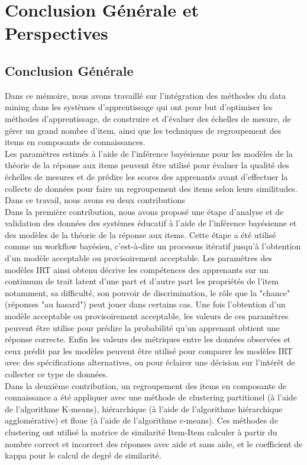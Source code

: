 \chapter*{Conclusion Générale et Perspectives }
\thispagestyle{empty}
\section*{Conclusion Générale}
Dans ce mémoire, nous avons travaillé sur l'intégration des méthodes du data mining dans les systèmes d'apprentissage qui ont pour but d’optimiser les méthodes d'apprentissage, de construire et d’évaluer des échelles de mesure, de gérer un grand nombre d’item, ainsi que les techniques de regroupement des items en composants de connaissances. \\
Les paramètres estimés à l’aide de l’inférence bayésienne pour les modèles de la théorie de la réponse aux items peuvent être utilisé pour évaluer la qualité des échelles de mesures et de prédire les scores des apprenants avant d’effectuer la collecte de données pour faire un regroupement des items selon leurs similitudes. \\
Dans ce travail, nous avons eu deux contributions \\
Dans la première contribution, nous avons proposé une étape d’analyse et de validation des données des systèmes éducatif à l’aide de l’inférence bayésienne et des modèles de la théorie de la réponse aux items. Cette étape a été utilisé comme un workflow bayésien, c’est-à-dire un processus itératif jusqu’à l’obtention d’un modèle acceptable ou provisoirement acceptable. Les paramètres des modèles IRT ainsi obtenu décrive les compétences des apprenants sur un continuum de trait latent d’une part et d’autre part les propriétés de l’item notamment, sa difficulté, son pouvoir de discrimination, le rôle que la "chance" (réponses "au hasard") peut jouer dans certains cas. Une fois l’obtention d’un modèle acceptable ou provisoirement acceptable, les valeurs de ces paramètres peuvent être utilise pour prédire la probabilité qu’un apprenant obtient une réponse correcte. Enfin les valeurs des métriques entre les données observées et ceux prédit par les modèles peuvent être utilisé pour comparer les modèles IRT avec des spécifications alternatives, ou pour éclairer une décision sur l'intérêt de collecter ce type de données. \\
Dans la deuxième contribution, un regroupement des items en composante de connaissance a été appliquer avec une méthode de clustering partitionel (à l'aide de l'algorithme K-means), hiérarchique (à l'aide de l'algorithme hiérarchique agglomérative) et floue (à l'aide de l'algorithme c-means). Ces méthodes de clustering ont utilisé la matrice de similarité Item-Item calculer à partir du nombre correct et incorrect des réponses avec aide et sans aide, et le coefficient de kappa pour le calcul de degré de similarité. \\


